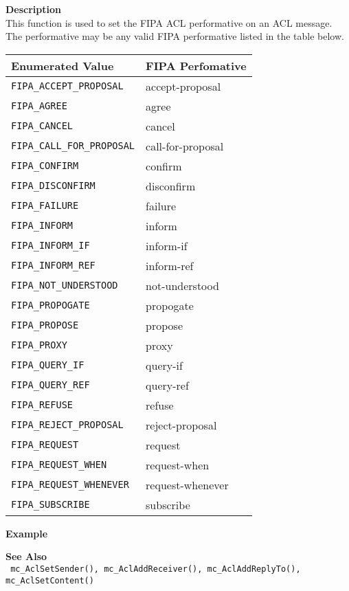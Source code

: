 \noindent
{\bf Description}\\
This function is used to set the FIPA ACL performative on an ACL message. 
The performative may be any valid FIPA performative listed in the table 
below. \\
\begin{tabular}{ll}
Enumerated Value & FIPA Perfomative \\ \hline
\texttt{FIPA\_ACCEPT\_PROPOSAL} & accept-proposal \\
\texttt{FIPA\_AGREE} & agree \\
\texttt{FIPA\_CANCEL} & cancel\\
\texttt{FIPA\_CALL\_FOR\_PROPOSAL} & call-for-proposal \\
\texttt{FIPA\_CONFIRM} & confirm\\
\texttt{FIPA\_DISCONFIRM} & disconfirm \\
\texttt{FIPA\_FAILURE} & failure \\
\texttt{FIPA\_INFORM} & inform \\
\texttt{FIPA\_INFORM\_IF} & inform-if \\
\texttt{FIPA\_INFORM\_REF} & inform-ref \\
\texttt{FIPA\_NOT\_UNDERSTOOD} & not-understood \\
\texttt{FIPA\_PROPOGATE} & propogate \\
\texttt{FIPA\_PROPOSE} & propose \\
\texttt{FIPA\_PROXY} & proxy \\
\texttt{FIPA\_QUERY\_IF} & query-if \\
\texttt{FIPA\_QUERY\_REF} & query-ref \\
\texttt{FIPA\_REFUSE} & refuse \\
\texttt{FIPA\_REJECT\_PROPOSAL} & reject-proposal \\
\texttt{FIPA\_REQUEST} & request \\
\texttt{FIPA\_REQUEST\_WHEN} & request-when \\
\texttt{FIPA\_REQUEST\_WHENEVER} & request-whenever \\
\texttt{FIPA\_SUBSCRIBE} & subscribe
\end{tabular}


\noindent
{\bf Example}\\
\noindent
{\footnotesize}

\noindent
{\bf See Also}\\
\texttt{
  mc\_AclSetSender(), mc\_AclAddReceiver(), mc\_AclAddReplyTo(), 
    \linebreak mc\_AclSetContent()
}

